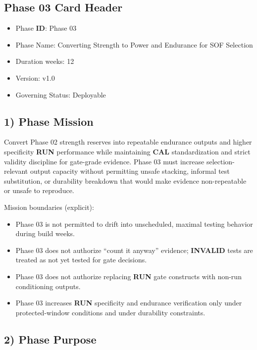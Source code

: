 \documentclass[10pt]{article}
\begin{document}
\subsection*{Phase 03 Card Header}
{}

\begin{itemize}
\item Phase \textbf{ID}: Phase 03
\item Phase Name: Converting Strength to Power and Endurance for SOF Selection
\item Duration weeks: 12
\item Version: v1.0
\item Governing Status: Deployable
\end{itemize}

\subsection*{1) Phase Mission}

Convert Phase 02 strength reserves into repeatable endurance outputs and higher specificity \textbf{RUN} performance while maintaining \textbf{CAL} standardization and strict validity discipline for gate-grade evidence. Phase 03 must increase selection-relevant output capacity without permitting unsafe stacking, informal test substitution, or durability breakdown that would make evidence non-repeatable or unsafe to reproduce.

Mission boundaries (explicit):

\begin{itemize}
\item Phase 03 is not permitted to drift into unscheduled, maximal testing behavior during build weeks.
\item Phase 03 does not authorize “count it anyway” evidence; \textbf{INVALID} tests are treated as not yet tested for gate decisions.
\item Phase 03 does not authorize replacing \textbf{RUN} gate constructs with non-run conditioning outputs.
\item Phase 03 increases \textbf{RUN} specificity and endurance verification only under protected-window conditions and under durability constraints.
\end{itemize}

\subsection*{2) Phase Purpose}
\end{document}
